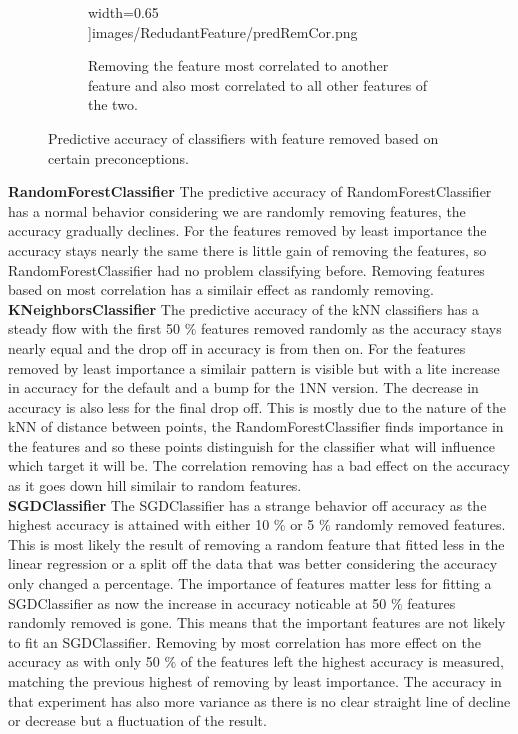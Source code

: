 \documentclass[a4paper,10pt]{article}
\begin{document}
\begin{figure}[H]
\begin{subfigure}[b]{0.45\textwidth}
		width=0.65\textwidth
		]{images/RedudantFeature/predRemCor.png}
		\caption{Removing the feature most correlated to another feature and also most correlated to all other features of the two.}
		\label{fig:predRemCor}
	\end{subfigure}
	
	\caption{Predictive accuracy of classifiers with feature removed based on certain preconceptions.}
	\label{fig:Rem}
\end{figure}

\textbf{RandomForestClassifier} The predictive accuracy of RandomForestClassifier has a normal behavior considering we are randomly removing features, the accuracy gradually declines. For the features removed by least importance the accuracy stays nearly the same there is little gain of removing the features, so RandomForestClassifier had no problem classifying before. Removing features based on most correlation has a similair effect as randomly removing. \\

\textbf{KNeighborsClassifier}  The predictive accuracy of the kNN classifiers has a steady flow with the first 50 $\%$ features removed randomly as the accuracy stays nearly equal and the drop off in accuracy is from then on. For the features removed by least importance a similair pattern is visible but with a lite increase in accuracy for the default and a bump for the 1NN version. The decrease in accuracy is also less for the final drop off. This is mostly due to the nature of the kNN of distance between points, the RandomForestClassifier finds importance in the features and so these points distinguish for the classifier what will influence which target it will be. The correlation removing has a bad effect on the accuracy as it goes down hill similair to random features.  \\

\textbf{SGDClassifier} The SGDClassifier has a strange behavior off accuracy as the highest accuracy is attained with either 10 $\%$ or 5 $\%$ randomly removed features. This is most likely the result of removing a random feature that fitted less in the linear regression or a split off the data that was better considering the accuracy only changed a percentage. The importance of features matter less for fitting a SGDClassifier as now the increase in accuracy noticable at 50 $\%$ features randomly removed is gone. This means that the important features are not likely to fit an SGDClassifier. Removing by most correlation has more effect on the accuracy as with only 50 $\%$ of the features left the highest accuracy is measured, matching the previous highest of removing by least importance. The accuracy in that experiment has also more variance as there is no clear straight line of decline or decrease but a fluctuation of the result.   \\
\end{document}
